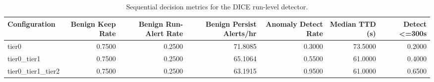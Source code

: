 \begin{table}[t]
\centering
\caption{Sequential decision metrics for the DICE run-level detector.}
\label{tab:dice_sequential_metrics}
\footnotesize
\begin{tabular}{lrrrrrr}
\toprule
Configuration & Benign Keep Rate & Benign Run-Alert Rate & Benign Persist Alerts/hr & Anomaly Detect Rate & Median TTD (s) & Detect <=300s \\
\midrule
tier0 & 0.7500 & 0.2500 & 71.8085 & 0.3000 & 73.5000 & 0.2000 \\
tier0_tier1 & 0.7500 & 0.2500 & 65.1064 & 0.5500 & 61.0000 & 0.4000 \\
tier0_tier1_tier2 & 0.7500 & 0.2500 & 63.1915 & 0.9500 & 61.0000 & 0.6500 \\
\bottomrule
\end{tabular}

\end{table}
